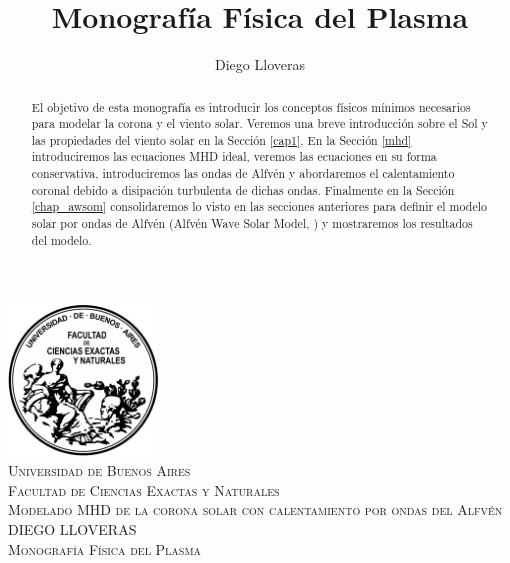 \documentclass[a4paper,11pt]{report}
\title{Monografía Física del Plasma}
\author{Diego Lloveras}
\begin{document}
\begin{center}
\includegraphics[width=0.3\textwidth]{figuras/Logo-fcenuba.pdf}\\[1cm]
\textsc{\LARGE Universidad de Buenos Aires}\\[0.5cm]
\textsc{\large Facultad de Ciencias Exactas y Naturales}\\[1cm]
\textsc{\LARGE Modelado MHD de la corona solar con calentamiento por ondas del Alfvén}\\[1cm]
\textsc{\large DIEGO LLOVERAS}\\[0.7cm]

\textsc{\large Monografía Física del Plasma}\\[0.5cm]
\end{center}
\tableofcontents

\begin{abstract}
El objetivo de esta monografía es introducir los conceptos físicos mínimos necesarios para modelar la corona y el viento solar. Veremos una breve introducción sobre el Sol y las propiedades del viento solar en la Sección \ref{cap1}. En la Sección \ref{mhd} introduciremos las ecuaciones MHD ideal, veremos las ecuaciones en su forma conservativa, introduciremos las ondas de Alfvén y abordaremos el calentamiento coronal debido a disipación turbulenta de dichas ondas. Finalmente en la Sección \ref{chap_awsom} consolidaremos lo visto en las secciones anteriores para definir el modelo solar por ondas de Alfvén (Alfvén Wave Solar Model, \citet{vander_2014}) y mostraremos los resultados del modelo.
\end{abstract}
\end{document}
